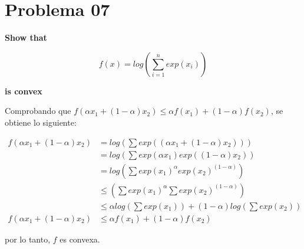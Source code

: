 \section*{Problema 07}

\textbf{Show that}

\begin{equation*}
    f(x) = log\left ( \sum_{i=1}^n exp(x_i) \right )
\end{equation*}

\textbf{is convex}


Comprobando que $f(\alpha x_1 + (1-\alpha)x_2) \leq \alpha f(x_1) + (1-\alpha)f(x_2)$, se obtiene lo siguiente:

\begin{align*}
    f(\alpha x_1 + (1-\alpha)x_2) & = log \left ( \sum exp((\alpha x_1 + (1-\alpha)x_2)) \right )                                 \\
                                  & = log \left (\sum exp(\alpha x_1) exp((1-\alpha)x_2) \right )                                 \\
                                  & = log \left (\sum exp(x_1)^\alpha exp(x_2)^(1-\alpha) \right )                                \\
                                  & \leq \left (\sum exp(x_1)^\alpha \sum  exp(x_2)^(1-\alpha)  \right )                          \\
                                  & \leq \alpha log \left ( \sum exp(x_1) \right ) + (1-\alpha) log \left (\sum exp(x_2) \right ) \\
    f(\alpha x_1 + (1-\alpha)x_2) & \leq \alpha f(x_1) + (1-\alpha) f(x_2)
\end{align*}

por lo tanto, $f$ es convexa.